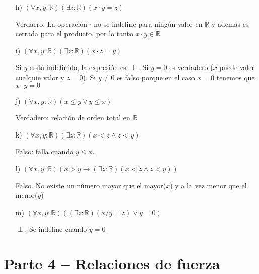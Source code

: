 \documentclass[10pt,a4paper]{article}
\begin{document}
\begin{enumerate}
\item[h)]$(\forall x, y : \mathbb{R})(\exists z : \mathbb{R})(x \cdot y = z)$

Verdaero. La operación $\cdot$ no se indefine para ningún valor en $\mathbb{R}$ y además es cerrada para el producto, por lo tanto $x \cdot y \in \mathbb{R} $

\item[i)]$(\forall x, y : \mathbb{R})(\exists z : \mathbb{R})(x \cdot z = y)$

Si $y$ esstá indefinido, la expresión es $\perp$. Si $y=0$ es verdadero ($x$ puede valer cualquie valor y $z=0$). Si $y\not =0$ es falso porque en el caso $x=0$ tenemos que $x \cdot y = 0$

\item[j)]$(\forall x, y : \mathbb{R})(x \leq y \vee y \leq x)$

Verdadero: relación de orden total en $\mathbb{R}$

\item[k)]$(\forall x, y : \mathbb{R})(\exists z : \mathbb{R})(x < z \wedge z < y)$

Falso: falla cuando $y \leq x$.

\item[l)]$(\forall x, y : \mathbb{R})(x > y \rightarrow (\exists z : \mathbb{R})(x < z \wedge z < y))$

Falso. No existe un número mayor que el mayor($x$) y a la vez menor que el menor($y$)

\item[m)]$(\forall x, y : \mathbb{R})((\exists z : \mathbb{R})(x/y = z) \vee y = 0)$

$\perp$. Se indefine cuando $y=0$
\end{enumerate}

\section*{Parte 4 – Relaciones de fuerza}
\end{document}
